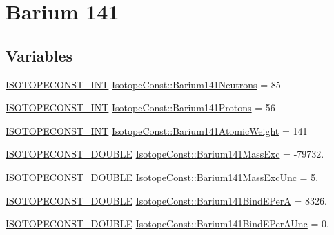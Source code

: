 \hypertarget{group___isotope_const-_barium-_ba141}{}\section{Barium 141}
\label{group___isotope_const-_barium-_ba141}
\subsection*{Variables}
\begin{DoxyCompactItemize}
\item 
\mbox{\hyperlink{group___isotope_const-_macros_ga5f18360b3e99483a35c32d789e62621c}{I\+S\+O\+T\+O\+P\+E\+C\+O\+N\+S\+T\+\_\+\+I\+NT}} \mbox{\hyperlink{group___isotope_const-_barium-_ba141_ga57ba9f1369284d2c83eb65658d34f4f2}{Isotope\+Const\+::\+Barium141\+Neutrons}} = 85
\item 
\mbox{\hyperlink{group___isotope_const-_macros_ga5f18360b3e99483a35c32d789e62621c}{I\+S\+O\+T\+O\+P\+E\+C\+O\+N\+S\+T\+\_\+\+I\+NT}} \mbox{\hyperlink{group___isotope_const-_barium-_ba141_ga17a126564402b2f4e7f14dcecfb8e16d}{Isotope\+Const\+::\+Barium141\+Protons}} = 56
\item 
\mbox{\hyperlink{group___isotope_const-_macros_ga5f18360b3e99483a35c32d789e62621c}{I\+S\+O\+T\+O\+P\+E\+C\+O\+N\+S\+T\+\_\+\+I\+NT}} \mbox{\hyperlink{group___isotope_const-_barium-_ba141_gac3c3a3a55ee5080df4c7657079dd3f3b}{Isotope\+Const\+::\+Barium141\+Atomic\+Weight}} = 141
\item 
\mbox{\hyperlink{group___isotope_const-_macros_ga8f45a7272ce02c0b4c65c44636ed719a}{I\+S\+O\+T\+O\+P\+E\+C\+O\+N\+S\+T\+\_\+\+D\+O\+U\+B\+LE}} \mbox{\hyperlink{group___isotope_const-_barium-_ba141_gaac197a28e3867b6281efe190dd20c954}{Isotope\+Const\+::\+Barium141\+Mass\+Exc}} = -\/79732.
\item 
\mbox{\hyperlink{group___isotope_const-_macros_ga8f45a7272ce02c0b4c65c44636ed719a}{I\+S\+O\+T\+O\+P\+E\+C\+O\+N\+S\+T\+\_\+\+D\+O\+U\+B\+LE}} \mbox{\hyperlink{group___isotope_const-_barium-_ba141_gad347d3b566fbc836798cc3c66199dad6}{Isotope\+Const\+::\+Barium141\+Mass\+Exc\+Unc}} = 5.
\item 
\mbox{\hyperlink{group___isotope_const-_macros_ga8f45a7272ce02c0b4c65c44636ed719a}{I\+S\+O\+T\+O\+P\+E\+C\+O\+N\+S\+T\+\_\+\+D\+O\+U\+B\+LE}} \mbox{\hyperlink{group___isotope_const-_barium-_ba141_ga90bd4709e963e9312217f0d85fb1b7ed}{Isotope\+Const\+::\+Barium141\+Bind\+E\+PerA}} = 8326.
\item 
\mbox{\hyperlink{group___isotope_const-_macros_ga8f45a7272ce02c0b4c65c44636ed719a}{I\+S\+O\+T\+O\+P\+E\+C\+O\+N\+S\+T\+\_\+\+D\+O\+U\+B\+LE}} \mbox{\hyperlink{group___isotope_const-_barium-_ba141_ga2f9a47b305f44d7afa4c1331f7891b82}{Isotope\+Const\+::\+Barium141\+Bind\+E\+Per\+A\+Unc}} = 0.

\end{DoxyCompactItemize}
